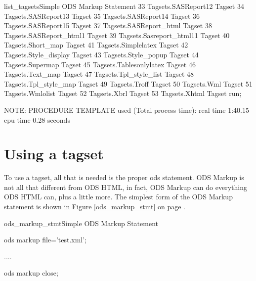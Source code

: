 \begin{fvcode}{list_tagsets}{Simple ODS Markup Statement}
                33     Tagsets.SASReport12              Tagset
                34     Tagsets.SASReport13              Tagset
                35     Tagsets.SASReport14              Tagset
                36     Tagsets.SASReport15              Tagset
                37     Tagsets.SASReport_html           Tagset
                38     Tagsets.SASReport_html1          Tagset
                39     Tagsets.Sasreport_html11         Tagset
                40     Tagsets.Short_map                Tagset
                41     Tagsets.Simplelatex              Tagset
                42     Tagsets.Style_display            Tagset
                43     Tagsets.Style_popup              Tagset
                44     Tagsets.Supermap                 Tagset
                45     Tagsets.Tablesonlylatex          Tagset
                46     Tagsets.Text_map                 Tagset
                47     Tagsets.Tpl_style_list           Tagset
                48     Tagsets.Tpl_style_map            Tagset
                49     Tagsets.Troff                    Tagset
                50     Tagsets.Wml                      Tagset
                51     Tagsets.Wmlolist                 Tagset
                52     Tagsets.Xbrl                     Tagset
                53     Tagsets.Xhtml                    Tagset
       run;

NOTE: PROCEDURE TEMPLATE used (Total process time):
      real time           1:40.15
      cpu time            0.28 seconds
      
\end{fvcode}

\section{Using a tagset}
To use a tagset, all that is needed is the proper ods statement.
ODS Markup is not all that different from ODS HTML, in fact, ODS
Markup can do everything ODS HTML can, plus a little more.
The simplest form of the ODS Markup statement is shown 
in Figure \ref{ods_markup_stmt} on page \pageref{ods_markup_stmt}.

\begin{fvcode}{ods_markup_stmt}{Simple ODS Markup Statement}
   
    ods markup file='test.xml';

    ....

    ods markup close;

\end{fvcode}

